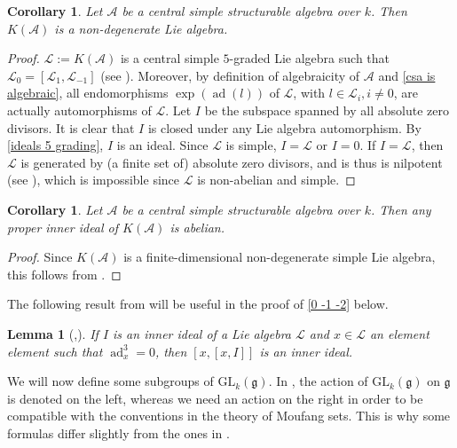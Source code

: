 \documentclass[oneside,a4paper]{amsart} %
\newtheorem{lemma}[theorem]{Lemma}
\newtheorem{corollary}[theorem]{Corollary}
\theoremstyle{definition}
\DeclareMathOperator{\ad}{ad}
\newcommand{\A}{\mathcal{A}}
\newcommand{\LL}{\mathcal{L}}
\numberwithin{equation}{section}
\begin{document}
\begin{corollary}
\label{A nondeg}
	Let $\A$ be a central simple structurable algebra over $k$. Then $K(\A)$ is a non-degenerate Lie algebra.
\end{corollary}
\begin{proof}
	$\LL:=K(\A)$ is a central simple $5$-graded Lie algebra such that $\LL_0=[\LL_1,\LL_{-1}]$ (see \cite[\S 5]{Allison1979}). 
	Moreover, by definition of algebraicity of $\A$ and \cref{csa is algebraic}, all endomorphisms $\exp (\ad (l))$ of $\LL$, with $l\in \LL_i, i\neq 0$, are actually automorphisms of $\LL$. 
	Let $I$ be the subspace spanned by all absolute zero divisors. It is clear that $I$ is closed under any Lie algebra automorphism.
	By \cref{ideals 5 grading}, $I$ is an ideal. 
	Since $\LL$ is simple, $I=\LL$ or $I=0$.
	If $I=\LL$, then $\LL$ is generated by (a finite set of) absolute zero divisors, and is thus is nilpotent (see \cite{Zelmanov1980}), which is impossible since $\LL$ is non-abelian and simple. 
\end{proof}

\begin{corollary}
\label{Inner abelian}
	Let $\A$ be a central simple structurable algebra over $k$. Then any proper inner ideal of $K(\A)$ is abelian. 
\end{corollary}
\begin{proof}
	Since $K(\A)$ is a finite-dimensional non-degenerate simple Lie algebra, this follows from \cite[Lemma 1.13]{Benkart1977}.
\end{proof}

The following result from \cite{Benkart1977} will be useful in the proof of \cref{0 -1 -2} below.

\begin{lemma}[{\cite[Lemma 1.8]{Benkart1977},\cite[Lemma 1.11]{Draper2008}}]
\label{Benkart Lemma}
	If $I$ is an inner ideal of a Lie algebra $\LL$ and $x\in \LL$ an element element such that $\ad_x^3=0$, then $[x,[x,I]]$ is an inner ideal.
\end{lemma}

We will now define some subgroups of $\mathrm{GL}_k(\mathfrak g)$. 
In \cite{Allison1999}, the action of $\mathrm{GL}_k(\mathfrak g)$ on $\mathfrak g$ is denoted on the left, whereas we need an action on the right in order to be compatible with the conventions in the theory of Moufang sets. 
This is why some formulas differ slightly from the ones in \cite{Allison1999}.
\end{document}

